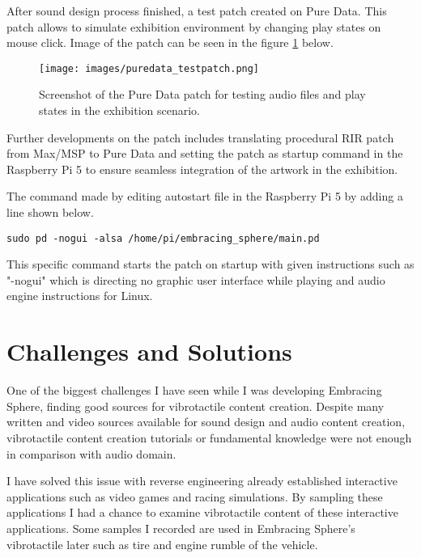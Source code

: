         After sound design process finished, a test patch created on Pure Data. This patch allows to simulate exhibition environment by changing play states on mouse click. Image of the patch can be seen in the figure \ref{fig:PUREDATA} below.\par

        \begin{figure}[H]
            \centering
            \texttt{[image: images/puredata\_testpatch.png]}
            \caption{Screenshot of the Pure Data patch for testing audio files and play states in the exhibition scenario.}
            \label{fig:PUREDATA}
        \end{figure}

        Further developments on the patch includes translating procedural RIR patch from Max/MSP to Pure Data and setting the patch as startup command in the Raspberry Pi 5 to ensure seamless integration of the artwork in the exhibition.\par

        The command made by editing autostart file in the Raspberry Pi 5 by adding a line shown below.\par
        
        \begin{verbatim}
sudo pd -nogui -alsa /home/pi/embracing_sphere/main.pd
        \end{verbatim}
        
        This specific command starts the patch on startup with given instructions such as "-nogui" which is directing no graphic user interface while playing and audio engine instructions for Linux.\par
    \section{Challenges and Solutions}
        One of the biggest challenges I have seen while I was developing Embracing Sphere, finding  good sources for vibrotactile content creation. Despite many written and video sources available for sound design and audio content creation, vibrotactile content creation tutorials or fundamental knowledge were not enough in comparison with audio domain.\par

        I have solved this issue with reverse engineering already established interactive applications such as video games and racing simulations. By sampling these applications I had a chance to examine vibrotactile content of these interactive applications. Some samples I recorded are used in Embracing Sphere's vibrotactile later such as tire and engine rumble of the vehicle.\par

